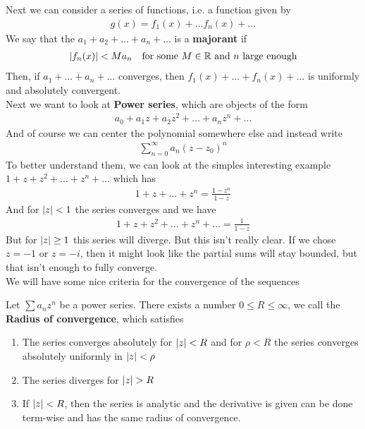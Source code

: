 Next we can consider a series of functions, i.e. a function given by
\begin{align*}
	g(x) = f_1(x) + \ldots f_n(x) + \ldots
\end{align*}
We say that the $a_1 + a_2 + \ldots + a_n + \ldots$ is a \textbf{majorant} if
\begin{align*}
	\vert f_n(x)\vert < M a_n \quad \text{for some } M \in \mathbb{R}\text{ and } n \text{ large enough}
\end{align*}
Then, if $a_1 + \ldots + a_n + \ldots$ converges, then $f_1(x) + \ldots + f_n(x) + \ldots$ is uniformly and absolutely convergent.\\

Next we want to look at \textbf{Power series}, which are objects of the form
\begin{align*}
a_0 + a_1z + a_2z^2 + \ldots + a_n z^n + \ldots
\end{align*}
And of course we can center the polynomial somewhere else and instead write
\begin{align*}
	\sum_{n= 0}^{\infty}a_n (z - z_0)^n
\end{align*}
To better understand them, we can look at the simples interesting example $1 + z + z^2 + \ldots + z^n + \ldots$ which has
\begin{align*}
	 1 + z + \ldots + z^n = \frac{1 - z^n}{1 -z}
\end{align*}
And for $\vert z\vert < 1$ the series converges and we have
\begin{align*}
1 + z + z^2 + \ldots + z^n + \ldots = \frac{1}{1-z}
\end{align*}
But for $\vert z\vert \geq 1$ this series will diverge. But this isn't really clear. If we chose $z = -1$ or $z = -i$, then it might look like the partial sums will stay bounded, but that isn't enough to fully converge.\\

We will have some nice criteria for the convergence of the sequences

\begin{theorem}[(Abel)]
Let $\sum a_n z^n$ be a power series. There exists a number $0 \leq R \leq \infty$, we call the \textbf{Radius of convergence}, which satisfies
\begin{enumerate}
\item The series converges absolutely for $\vert z\vert < R$ and for $\rho < R$ the series converges absolutely uniformly in $\vert z\vert < \rho$
\item The series diverges for $\vert z\vert > R$
\item If $\vert z\vert < R$, then the series is analytic and the derivative is given can be done term-wise and has the same radius of convergence.
\end{enumerate}
\end{theorem}

